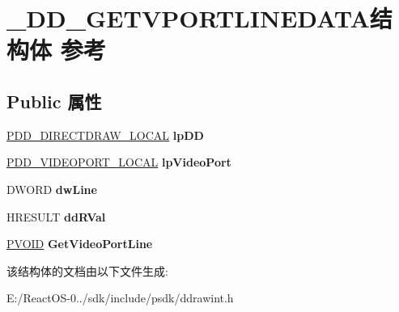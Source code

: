 \hypertarget{struct___d_d___g_e_t_v_p_o_r_t_l_i_n_e_d_a_t_a}{}\section{\+\_\+\+D\+D\+\_\+\+G\+E\+T\+V\+P\+O\+R\+T\+L\+I\+N\+E\+D\+A\+T\+A结构体 参考}
\label{struct___d_d___g_e_t_v_p_o_r_t_l_i_n_e_d_a_t_a}
\subsection*{Public 属性}
\begin{DoxyCompactItemize}
\item 
\mbox{\label{struct___d_d___g_e_t_v_p_o_r_t_l_i_n_e_d_a_t_a_ada022e305677c5fa53740bbab8de4d7d}} 
\hyperlink{struct___d_d___d_i_r_e_c_t_d_r_a_w___l_o_c_a_l}{P\+D\+D\+\_\+\+D\+I\+R\+E\+C\+T\+D\+R\+A\+W\+\_\+\+L\+O\+C\+AL} {\bfseries lp\+DD}
\item 
\mbox{\label{struct___d_d___g_e_t_v_p_o_r_t_l_i_n_e_d_a_t_a_a958628554111d64eb86c1d963189ff62}} 
\hyperlink{struct___d_d___v_i_d_e_o_p_o_r_t___l_o_c_a_l}{P\+D\+D\+\_\+\+V\+I\+D\+E\+O\+P\+O\+R\+T\+\_\+\+L\+O\+C\+AL} {\bfseries lp\+Video\+Port}
\item 
\mbox{\label{struct___d_d___g_e_t_v_p_o_r_t_l_i_n_e_d_a_t_a_ad5dc7273a66854299ae97a4e44036569}} 
D\+W\+O\+RD {\bfseries dw\+Line}
\item 
\mbox{\label{struct___d_d___g_e_t_v_p_o_r_t_l_i_n_e_d_a_t_a_a9948ac0eee450e24a23554d1a53ff914}} 
H\+R\+E\+S\+U\+LT {\bfseries dd\+R\+Val}
\item 
\mbox{\label{struct___d_d___g_e_t_v_p_o_r_t_l_i_n_e_d_a_t_a_aa43c3d9999426ebc6835820531e78a3d}} 
\hyperlink{interfacevoid}{P\+V\+O\+ID} {\bfseries Get\+Video\+Port\+Line}
\end{DoxyCompactItemize}


该结构体的文档由以下文件生成\+:\begin{DoxyCompactItemize}
\item 
E\+:/\+React\+O\+S-\/0../sdk/include/psdk/ddrawint.\+h\end{DoxyCompactItemize}
